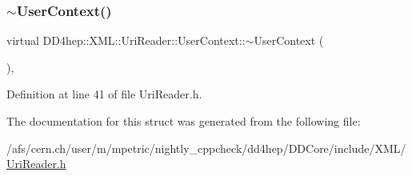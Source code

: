 \subsubsection{\texorpdfstring{$\sim$\+User\+Context()}{~UserContext()}}
{\footnotesize\ttfamily virtual D\+D4hep\+::\+X\+M\+L\+::\+Uri\+Reader\+::\+User\+Context\+::$\sim$\+User\+Context (\begin{DoxyParamCaption}{ }\end{DoxyParamCaption})\hspace{0.3cm}{\ttfamily [inline]}, {\ttfamily [virtual]}}



Definition at line 41 of file Uri\+Reader.\+h.



The documentation for this struct was generated from the following file\+:\begin{DoxyCompactItemize}
\item 
/afs/cern.\+ch/user/m/mpetric/nightly\+\_\+cppcheck/dd4hep/\+D\+D\+Core/include/\+X\+M\+L/\hyperlink{_uri_reader_8h}{Uri\+Reader.\+h}\end{DoxyCompactItemize}
